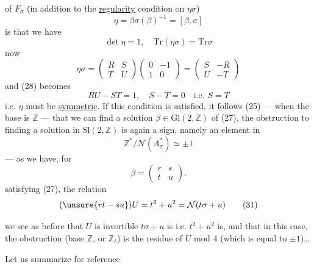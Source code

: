 of $F_\sigma$ (in addition to the \uline{regularity} condition on $\eta\sigma$)
\[
\eta=\beta\sigma(\beta)^{-1}=[\beta,\sigma] \tag{27}
\]
is that we have
\[
\det\eta=1,\quad \mathrm{Tr}(\eta\sigma)=\mathrm{Tr}\sigma \tag{28}
\]
now
\[
\eta\sigma=\begin{pmatrix}R&S\\T&U\end{pmatrix}
\begin{pmatrix}0&-1\\1&0\end{pmatrix}
=\begin{pmatrix}S&-R\\U&-T\end{pmatrix}
\]
and (28) becomes
\[
RU-ST=1,\quad S-T=0\quad\text{i.e. }S=T \tag{29}
\]
i.e. $\eta$ must be \uline{symmetric}.  If this condition is satisfied, it follows  (25) --- when the base is $\mathbb{Z}$ --- that we can find a solution $\beta\in\mathrm{Gl}(2,\mathbb{Z})$ of (27), the obstruction to finding a solution in $\mathrm{Sl}(2,\mathbb{Z})$ is again a sign, namely an element in
\[
\mathbb{Z}^*/\mathcal{N}(A_\sigma^*)\simeq\pm1
\]
--- as we have, for
\[
\beta=\begin{pmatrix}r&s\\t&u\end{pmatrix}. \tag{30}
\]
 satisfying (27), the relation\margin{\unsure{$\varepsilon$}}
\[
(\unsure{rt-su})U=t^2+u^2=\mathcal{N}(t\sigma+u) \tag{31}
\]


we see as before that $U$ is invertible  $t\sigma+u$ is i.e. $t^2+u^2$ is, and that in this case, the obstruction  (base $\mathbb{Z}$, or $\mathbb{Z}_\ell$) is the residue of $U$ mod $4$ (which is equal to $\pm1$)\ldots
{}

Let us summarize for reference

